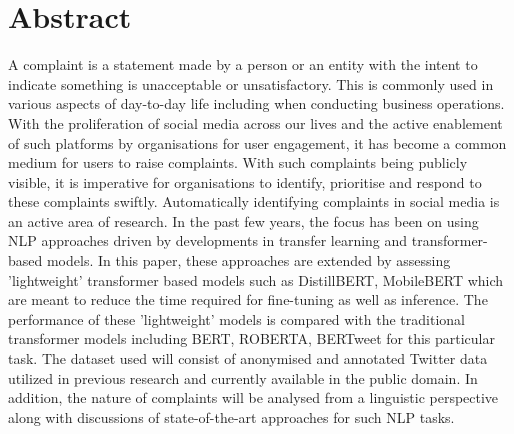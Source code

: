 \chapter*{\Large \center Abstract}

A complaint is a statement made by a person or an entity with the intent to indicate something is unacceptable or unsatisfactory. This is commonly used in various aspects of day-to-day life including when conducting business operations. With the proliferation of social media across our lives and the active enablement of such platforms by organisations for user engagement, it has become a common medium for users to raise complaints. With such complaints being publicly visible, it is imperative for organisations to identify, prioritise and respond to these complaints swiftly. Automatically identifying complaints in social media is an active area of research. In the past few years, the focus has been on using NLP approaches driven by developments in transfer learning and transformer-based models. \newline\newline
In this paper, these approaches are extended by assessing 'lightweight' transformer based models such as DistillBERT, MobileBERT which are meant to reduce the time required for fine-tuning as well as inference. The performance of these 'lightweight' models is compared with the traditional transformer models including BERT, ROBERTA, BERTweet for this particular task. The dataset used will consist of anonymised and annotated Twitter data utilized in previous research and currently available in the public domain. In addition, the nature of complaints will be analysed from a linguistic perspective along with discussions of  state-of-the-art approaches for such NLP tasks.